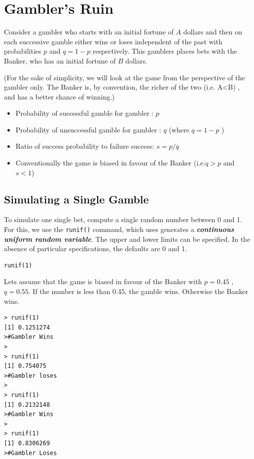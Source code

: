 \documentclass[11pt]{article} %
\begin{document}
\section{Gambler's Ruin}
Consider a gambler who starts with an initial fortune of $A$ dollars and then on each successive gamble
either wins  or loses independent of the past with probabilities $p$ and $q = 1- p$ respectively.
This gamblers places bets with the Banker, who has an initial fortune of $B$ dollars. 

(For the sake of simplicity, we will look at the game from the perspective of the gambler only. The Banker is, by convention, the richer of the two (i.e. A<B) , and has a better chance of winning.)

\begin{itemize}
\item Probability of successful gamble for gambler : $p$
\item Probability of unsuccessful gamble for gambler : $q$ (where $q = 1 - p$ )
\item Ratio of success probability to failure success: $s = p/q$
\item Conventionally the game is biased in favour of the Banker (i.e.$ q > p$ and $s < 1$)
\end{itemize}


\subsection{Simulating a Single Gamble}
To simulate one single bet, compute a single random number between 0 and 1. For this, we 
use the \texttt{runif()} command, which uses generates a \textbf{\textit{continuous uniform random variable}}. The upper and lower limits can be specified. In the absence of particular specifications, the defaults are 0 and 1.
\begin{framed}
\begin{verbatim}
runif(1)
\end{verbatim}
\end{framed}
Lets assume that the game is biased in favour of the Banker with $p = 0.45$ ,$q = 0.55$. If the
number is less than 0.45, the gamble wins. Otherwise the Banker wins.
\begin{verbatim}
> runif(1)
[1] 0.1251274
>#Gambler Wins
>
> runif(1)
[1] 0.754075
>#Gambler loses
>
> runif(1)
[1] 0.2132148
>#Gambler Wins
>
> runif(1)
[1] 0.8306269
>#Gambler Loses
\end{verbatim}
\newpage
\end{document}
